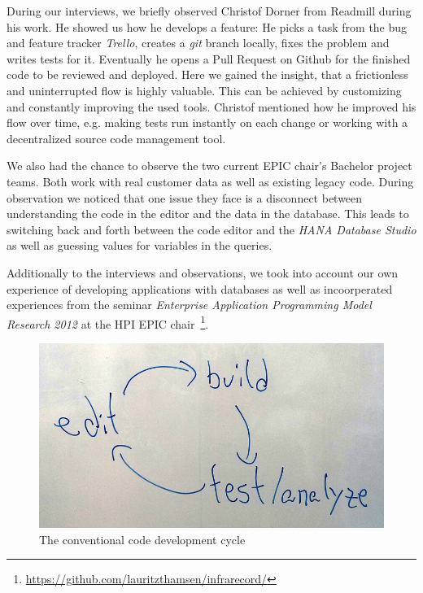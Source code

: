 
During our interviews, we briefly observed Christof Dorner from Readmill during his work. He showed us how he develops a feature: He picks a task from the bug and feature tracker \emph{Trello}, creates a \emph{git} branch locally, fixes the problem and writes tests for it. Eventually he opens a Pull Request on Github for the finished code to be reviewed and deployed. Here we gained the insight, that a frictionless and uninterrupted flow is highly valuable. This can be achieved by customizing and constantly improving the used tools. Christof mentioned how he improved his flow over time, e.g. making tests run instantly on each change or working with a decentralized source code management tool.

We also had the chance to observe the two current EPIC chair's Bachelor project teams. Both work with real customer data as well as existing legacy code. During observation we noticed that one issue they face is a disconnect between understanding the code in the editor and the data in the database. This leads to switching back and forth between the code editor and the \emph{HANA Database Studio} as well as guessing values for variables in the queries.

Additionally to the interviews and observations, we took into account our own experience of developing applications with databases as well as incoorperated experiences from the seminar \emph{Enterprise Application Programming Model Research 2012} at the HPI EPIC chair~\footnote{\url{https://github.com/lauritzthamsen/infrarecord/}}.

\begin{figure}
    \includegraphics[width=\linewidth]{images/EditBuildTest.jpg}
    \caption{The conventional code development cycle}
    \label{fig:cycle}
\end{figure}

